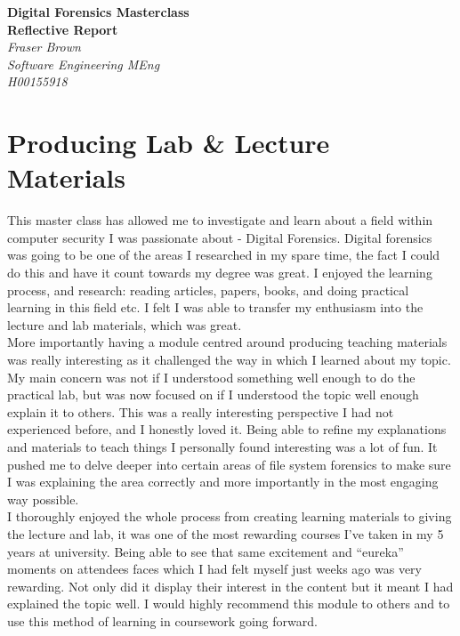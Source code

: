\documentclass[a4paper,11pt]{article}
\author{Fraser Brown}
\date{\today}
\begin{document}
\begin{titlepage}
   \begin{center}
      \Large\textbf{Digital Forensics Masterclass \\ Reflective Report}\\
      \large\textit{Fraser Brown\\Software Engineering MEng\\H00155918}
   \end{center}
\end{titlepage}

\tableofcontents
\newpage


\section{Producing Lab {\&} Lecture Materials}
This master class has allowed me to investigate and learn about a field within computer security I was passionate about - Digital Forensics. Digital forensics was going to be one of the areas I researched in my spare time, the fact I could do this and have it count towards my degree was great. I enjoyed the learning process, and research: reading articles, papers, books, and doing practical learning in this field etc. I felt I was able to transfer my enthusiasm into the lecture and lab materials, which was great.\\ 

More importantly having a module centred around producing teaching materials was really interesting as it challenged the way in which I learned about my topic. My main concern was not if I understood something well enough to do the practical lab, but was now focused on if I understood the topic well enough explain it to others. This was a really interesting perspective I had not experienced before, and I honestly loved it. Being able to refine my explanations and materials to teach things I personally found interesting was a lot of fun. It pushed me to delve deeper into certain areas of file system forensics to make sure I was explaining the area correctly and more importantly in the most engaging way possible. \\

I thoroughly enjoyed the whole process from creating learning materials to giving the lecture and lab, it was one of the most rewarding courses I've taken in my 5 years at university. Being able to see that same excitement and ``eureka'' moments on attendees faces which I had felt myself just weeks ago was very rewarding. Not only did it display their interest in the content but it meant I had explained the topic well. I would highly recommend this module to others and to use this method of learning in coursework going forward.
\end{document}
